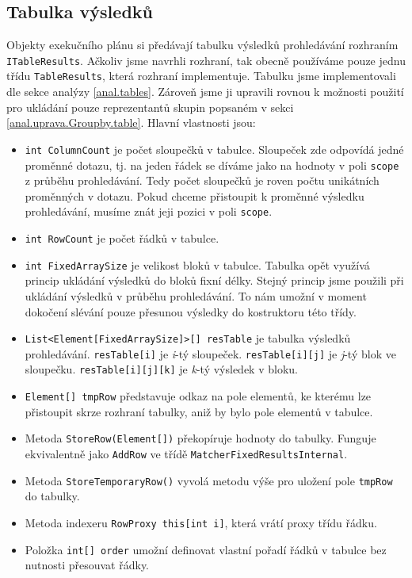 \subsection{Tabulka výsledků}

Objekty exekučního plánu si předávají tabulku výsledků prohledávání rozhraním \texttt{ITableResults}.
Ačkoliv jsme navrhli rozhraní, tak obecně používáme pouze jednu třídu \texttt{TableResults}, která rozhraní implementuje.
Tabulku jsme implementovali dle sekce analýzy \ref{anal.tables}.
Zároveň jsme ji upravili rovnou k možnosti použití pro ukládání pouze reprezentantů skupin popsaném v sekci \ref{anal.uprava.Groupby.table}.
Hlavní vlastnosti jsou:
\begin{itemize}
\item \texttt{int ColumnCount} je počet sloupečků v tabulce.
Sloupeček zde odpovídá jedné proměnné dotazu, tj. na jeden řádek se díváme jako na hodnoty v poli \texttt{scope} z průběhu prohledávání.
Tedy počet sloupečků je roven počtu unikátních proměnných v dotazu.
Pokud chceme přistoupit k proměnné výsledku prohledávání, musíme znát jeji pozici v poli \texttt{scope}.

\item \texttt{int RowCount} je počet řádků v tabulce.
\item \texttt{int FixedArraySize} je velikost bloků v tabulce.
Tabulka opět využívá princip ukládání výsledků do bloků fixní délky.
Stejný princip jsme použili při ukládání výsledků v průběhu prohledávání.
To nám umožní v moment dokočení slévání pouze přesunou výsledky do kostruktoru této třídy.
\item \texttt{List<Element[FixedArraySize]>[] resTable} je tabulka výsledků prohledávání.
\texttt{resTable[i]} je \textit{i}-tý sloupeček.
\texttt{resTable[i][j]} je \textit{j}-tý blok ve sloupečku.
\texttt{resTable[i][j][k]} je \textit{k}-tý výsledek v bloku.
\item \texttt{Element[] tmpRow} představuje odkaz na pole elementů, ke kterému lze přistoupit skrze rozhraní tabulky, aniž by bylo pole elementů v tabulce.
\item Metoda \texttt{StoreRow(Element[])} překopíruje hodnoty do tabulky. Funguje ekvivalentně jako \texttt{AddRow} ve třídě \texttt{MatcherFixedResultsInternal}.
\item Metoda \texttt{StoreTemporaryRow()} vyvolá metodu výše pro uložení pole \texttt{tmpRow} do tabulky.
\item Metoda indexeru \texttt{RowProxy this[int i]}, která vrátí proxy třídu řádku.
\item Položka \texttt{int[] order} umožní definovat vlastní pořadí řádků v tabulce bez nutnosti přesouvat řádky.

\end{itemize}
